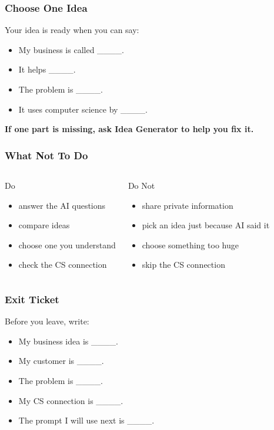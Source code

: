\documentclass[aspectratio=169]{beamer}
\begin{document}
\begin{frame}[plain]
\frametitle{Choose One Idea}
\begin{block}{Your idea is ready when you can say:}
\begin{itemize}
\large
\item My business is called \_\_\_\_.
\item It helps \_\_\_\_.
\item The problem is \_\_\_\_.
\item It uses computer science by \_\_\_\_.
\end{itemize}
\end{block}
\vspace{0.2cm}
\begin{center}
\Large\bfseries If one part is missing, ask Idea Generator to help you fix it.
\end{center}
\end{frame}

\begin{frame}[plain]
\frametitle{What Not To Do}
\begin{columns}[T,totalwidth=\textwidth]
\begin{block}{Do}
\begin{itemize}
\large
\item answer the AI questions
\item compare ideas
\item choose one you understand
\item check the CS connection
\end{itemize}
\end{block}
\begin{block}{Do Not}
\begin{itemize}
\large
\item share private information
\item pick an idea just because AI said it
\item choose something too huge
\item skip the CS connection
\end{itemize}
\end{block}
\end{columns}
\end{frame}

\begin{frame}[plain]
\frametitle{Exit Ticket}
\begin{block}{Before you leave, write:}
\begin{itemize}
\large
\item My business idea is \_\_\_\_.
\item My customer is \_\_\_\_.
\item The problem is \_\_\_\_.
\item My CS connection is \_\_\_\_.
\item The prompt I will use next is \_\_\_\_.
\end{itemize}
\end{block}
\end{frame}
\end{document}
